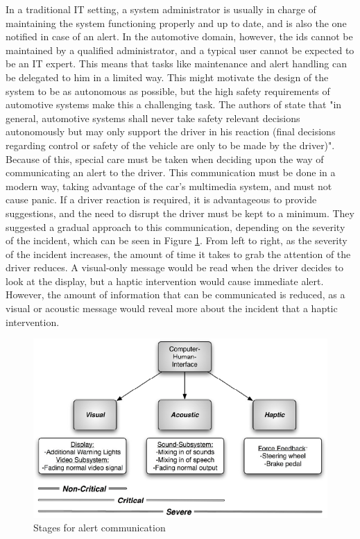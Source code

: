 In a traditional IT setting, a system administrator is usually in charge of maintaining the system functioning properly and up to date, and is also the one notified in case of an alert. In the automotive domain, however, the \gls{ids} cannot be maintained by a qualified administrator, and a typical user cannot be expected to be an IT expert. This means that tasks like maintenance and alert handling can be delegated to him in a limited way. This might motivate the design of the system to be as autonomous as possible, but the high safety requirements of automotive systems make this a challenging task. The authors of \citep{hoppe2009applying} state that "in general, automotive systems shall never take safety relevant decisions autonomously but may only support the driver in his reaction (final decisions regarding control or safety of the vehicle are only to be made by the driver)". Because of this, special care must be taken when deciding upon the way of communicating an alert to the driver. This communication must be done in a modern way, taking advantage of the car's multimedia system, and must not cause panic. If a driver reaction is required, it is advantageous to provide suggestions, and the need to disrupt the driver must be kept to a minimum. They suggested a gradual approach to this communication, depending on the severity of the incident, which can be seen in Figure \ref{fig:ids_communication}. From left to right, as the severity of the incident increases, the amount of time it takes to grab the attention of the driver reduces. A visual-only message would be read when the driver decides to look at the display, but a haptic intervention would cause immediate alert. However, the amount of information that can be communicated is reduced, as a visual or acoustic message would reveal more about the incident that a haptic intervention.

\begin{figure}
    \centering
    \includegraphics[width = \textwidth]{img/parts/introduction/IDS Communication.png}
    \caption{Stages for alert communication \citep{hoppe2009applying}}
    \label{fig:ids_communication}
\end{figure}

